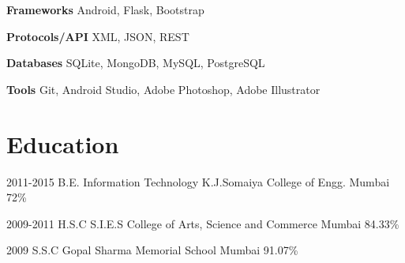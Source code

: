 \documentclass[10pt, a4paper, sans]{moderncv}
\begin{document}
\cvitem
{\bfseries{Frameworks}}
{Android, Flask, Bootstrap}

\cvitem
{\bfseries{Protocols/API}}
{XML, JSON, REST}

\cvitem
{\bfseries{Databases}}
{SQLite, MongoDB, MySQL, PostgreSQL}

\cvitem
{\bfseries{Tools}}
{Git, Android Studio, Adobe Photoshop, Adobe Illustrator}

\section{Education}
\cventry
{2011-2015}
{B.E. Information Technology}
{K.J.Somaiya College of Engg.}
{Mumbai}
{72\%}
{}

\cventry
{2009-2011}
{H.S.C}
{S.I.E.S College of Arts, Science and Commerce}
{Mumbai}
{84.33\%}
{}

\cventry
{2009}
{S.S.C}
{Gopal Sharma Memorial School}
{Mumbai}
{91.07\%}
{}
\end{document}
